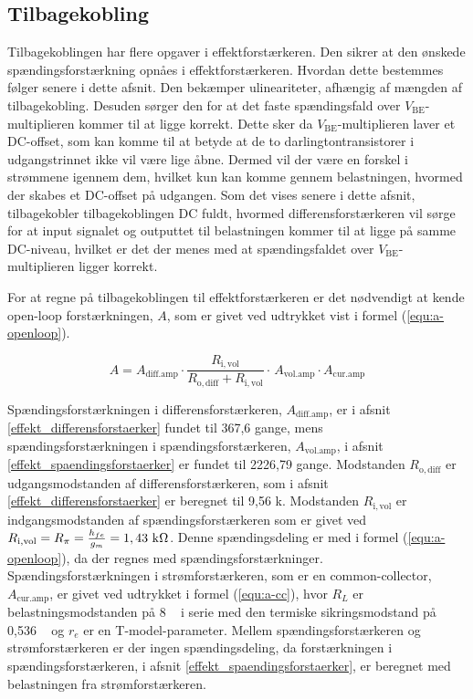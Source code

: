 \subsection{Tilbagekobling}
\label{effekt_tilbagekobling}
Tilbagekoblingen har flere opgaver i effektforstærkeren. Den sikrer at den ønskede spændingsforstærkning opnåes i effektforstærkeren. Hvordan dette bestemmes følger senere i dette afsnit. Den bekæmper ulineariteter, afhængig af mængden af tilbagekobling. Desuden sørger den for at det faste spændingsfald over $V_\mathrm{BE}$-multiplieren kommer til at ligge korrekt. Dette sker da $V_\mathrm{BE}$-multiplieren laver et DC-offset, som kan komme til at betyde at de to darlingtontransistorer i udgangstrinnet ikke vil være lige åbne. Dermed vil der være en forskel i strømmene igennem dem, hvilket kun kan komme gennem belastningen, hvormed der skabes et DC-offset på udgangen. Som det vises senere i dette afsnit, tilbagekobler tilbagekoblingen DC fuldt, hvormed differensforstærkeren vil sørge for at input signalet og outputtet til belastningen kommer til at ligge på samme DC-niveau, hvilket er det der menes med at spændingsfaldet over $V_\mathrm{BE}$-multiplieren ligger korrekt. 

For at regne på tilbagekoblingen til effektforstærkeren er det nødvendigt at kende open-loop forstærkningen, $A$, som er givet ved udtrykket vist i formel (\ref{equ:a-openloop}).

\begin{equation}
\label{equ:a-openloop}
A = A_\mathrm{diff.amp} \cdot \frac{R_\mathrm{i,vol}}{R_\mathrm{o,diff} + R_\mathrm{i,vol}} \cdot \frac{}{} A_\mathrm{vol.amp} \cdot A_\mathrm{cur.amp}
\end{equation}

Spændingsforstærkningen i differensforstærkeren, $A_\mathrm{diff.amp}$, er i afsnit \ref{effekt_differensforstaerker} fundet til 367,6 gange, mens spændingsforstærkningen i spændingsforstærkeren, $A_\mathrm{vol.amp}$, i afsnit \ref{effekt_spaendingsforstaerker} er fundet til 2226,79 gange. Modstanden $R_\mathrm{o,diff}$ er udgangsmodstanden af differensforstærkeren, som i afsnit \ref{effekt_differensforstaerker} er beregnet til 9,56 k\ohm. Modstanden $R_\mathrm{i,vol}$ er indgangsmodstanden af spændingsforstærkeren som er givet ved $R_\mathrm{i,vol} = R_\pi = \frac{h_{fe}}{g_m} = 1,43~\mathrm{k}\ohm$. Denne spændingsdeling er med i formel (\ref{equ:a-openloop}), da der regnes med spændingsforstærkninger. Spændingsforstærkningen i strømforstærkeren, som er en common-collector, $A_\mathrm{cur.amp}$, er givet ved udtrykket i formel (\ref{equ:a-cc}), hvor $R_L$ er belastningsmodstanden på 8 \ohm~ i serie med den termiske sikringsmodstand på 0,536 \ohm~ og $r_e$ er en T-model-parameter. Mellem spændingsforstærkeren og strømforstærkeren er der ingen spændingsdeling, da forstærkningen i spændingsforstærkeren, i afsnit \ref{effekt_spaendingsforstaerker}, er beregnet med belastningen fra strømforstærkeren.

